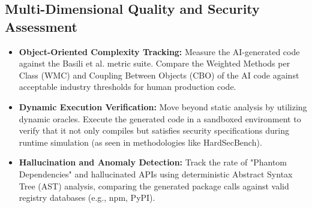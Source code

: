 \subsection{Multi-Dimensional Quality and Security Assessment}
\begin{itemize}
    \item \textbf{Object-Oriented Complexity Tracking:} Measure the AI-generated code against the Basili et al. metric suite. Compare the Weighted Methods per Class (WMC) and Coupling Between Objects (CBO) of the AI code against acceptable industry thresholds for human production code.
    \item \textbf{Dynamic Execution Verification:} Move beyond static analysis by utilizing dynamic oracles. Execute the generated code in a sandboxed environment to verify that it not only compiles but satisfies security specifications during runtime simulation (as seen in methodologies like HardSecBench).
    \item \textbf{Hallucination and Anomaly Detection:} Track the rate of "Phantom Dependencies" and hallucinated APIs using deterministic Abstract Syntax Tree (AST) analysis, comparing the generated package calls against valid registry databases (e.g., npm, PyPI).
\end{itemize}

